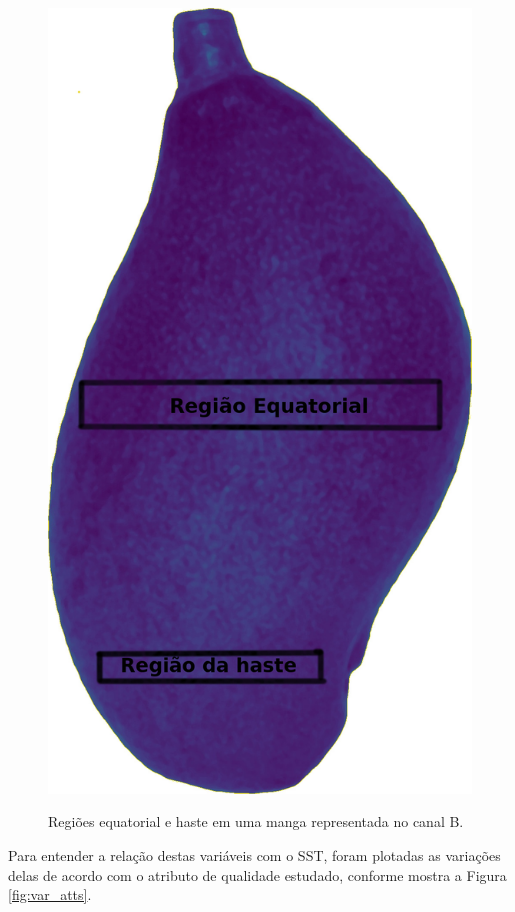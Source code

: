 \begin{figure}[H]
\centering
	\caption{Regiões equatorial e haste em uma manga representada no canal B.}
	\includegraphics[scale=0.17]{img/B_img.jpg}
	\label{fig:equator_stalk_b}
\end{figure}

Para entender a relação destas variáveis com o SST, foram plotadas as variações delas de acordo com o atributo de qualidade estudado, conforme mostra a Figura \ref{fig:var_atts}.

